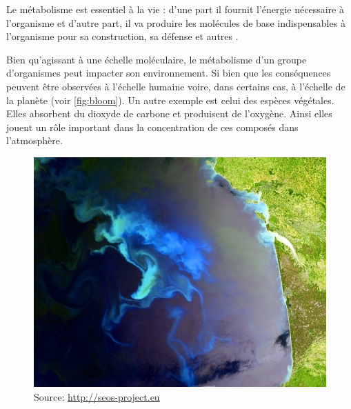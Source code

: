 \begin{refsegment}
    Le métabolisme est essentiel à la vie : d'une part il fournit l'énergie nécessaire à l'organisme et d'autre part, il va produire les molécules de base indispensables à l'organisme pour sa construction, sa défense et autres .
    
    Bien qu'agissant à une échelle moléculaire, le métabolisme d'un groupe d'organismes peut impacter son environnement. Si bien que les conséquences peuvent être observées à l'échelle humaine voire, dans certains cas, à l'échelle de la planète (voir \cref{fig:bloom}). Un autre exemple est celui des espèces végétales. Elles absorbent du dioxyde de carbone et produisent de l'oxygène. Ainsi elles jouent un rôle important dans la concentration de ces composés dans l’atmosphère.
    
    
    \begin{shadedfigure}[H]
        \begin{subfigure}[b]{.5\textwidth}
            \centering
            \includegraphics[width=\textwidth]{img/bloom_gascogne.jpg}
            \caption{{\tiny Source: \url{http://seos-project.eu}}}
            \label{fig:bloom_gascogne}
        \end{subfigure}
        \hfill
        \begin{subfigure}[b]{.5\textwidth}
            \centering

\end{subfigure}
\end{shadedfigure}
\end{refsegment}
